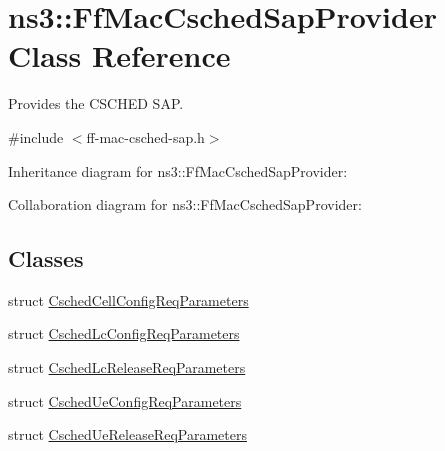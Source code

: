 \hypertarget{classns3_1_1FfMacCschedSapProvider}{}\section{ns3\+:\+:Ff\+Mac\+Csched\+Sap\+Provider Class Reference}
\label{classns3_1_1FfMacCschedSapProvider}


Provides the C\+S\+C\+H\+ED S\+AP.  




{\ttfamily \#include $<$ff-\/mac-\/csched-\/sap.\+h$>$}



Inheritance diagram for ns3\+:\+:Ff\+Mac\+Csched\+Sap\+Provider\+:


Collaboration diagram for ns3\+:\+:Ff\+Mac\+Csched\+Sap\+Provider\+:
\subsection*{Classes}
\begin{DoxyCompactItemize}
\item 
struct \hyperlink{structns3_1_1FfMacCschedSapProvider_1_1CschedCellConfigReqParameters}{Csched\+Cell\+Config\+Req\+Parameters}
\item 
struct \hyperlink{structns3_1_1FfMacCschedSapProvider_1_1CschedLcConfigReqParameters}{Csched\+Lc\+Config\+Req\+Parameters}
\item 
struct \hyperlink{structns3_1_1FfMacCschedSapProvider_1_1CschedLcReleaseReqParameters}{Csched\+Lc\+Release\+Req\+Parameters}
\item 
struct \hyperlink{structns3_1_1FfMacCschedSapProvider_1_1CschedUeConfigReqParameters}{Csched\+Ue\+Config\+Req\+Parameters}
\item 
struct \hyperlink{structns3_1_1FfMacCschedSapProvider_1_1CschedUeReleaseReqParameters}{Csched\+Ue\+Release\+Req\+Parameters}
\end{DoxyCompactItemize}
